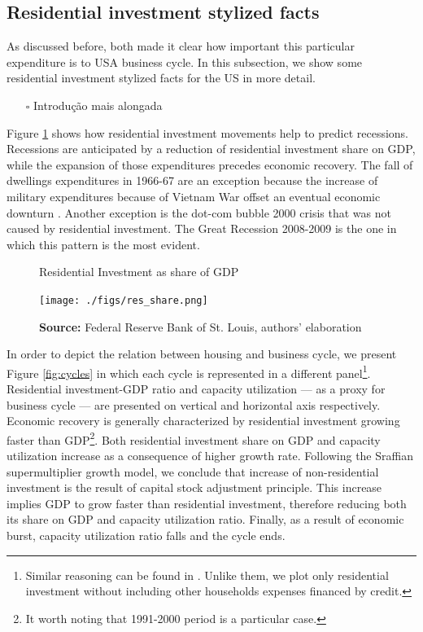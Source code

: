 \documentclass[11pt]{article}
\begin{document}
\subsection{Residential investment stylized facts}
\label{sec:orgb68aa85}

As discussed before, both \textcites{green_follow_1997}{leamer_housing_2007} made it clear how important this particular expenditure is to USA business cycle. In this subsection, we show some residential investment stylized facts for the US in more detail.

\begin{itemize}
\item[{$\square$}] Introdução mais alongada
\end{itemize}

Figure \ref{Investo_Resid_GDP} shows how residential investment movements help to predict recessions. Recessions are anticipated by a reduction of residential investment share on GDP, while the expansion of those expenditures precedes economic recovery. The fall of dwellings expenditures in 1966-67 are an exception because the increase of military expenditures because of Vietnam War offset an eventual economic downturn \cite[p.~20]{leamer_housing_2007}. Another exception is the dot-com bubble 2000 crisis that was not caused by residential investment. The Great Recession 2008-2009 is the one in which this pattern is the most evident. 



\begin{figure}[htb]
    \centering
        \caption{Residential Investment as share of GDP}
        \label{Investo_Resid_GDP}
    \texttt{[image: ./figs/res\_share.png]}
    \caption*{\textbf{Source:} Federal Reserve Bank of St. Louis, authors’ elaboration}
\end{figure}

In order to depict the relation between housing and business cycle, we present Figure \ref{fig:cycles} in which each cycle is represented in a different panel\footnote{Similar reasoning can be found in \textcite{fiebiger_trend_2017}. Unlike them, we plot only residential investment without including other households expenses financed by credit.}.
Residential investment-GDP ratio and capacity utilization --- as a proxy for business cycle --- are presented on vertical and horizontal axis respectively.
Economic recovery is generally characterized by residential investment growing faster than GDP\footnote{It worth noting that 1991-2000 period is a particular case.}. Both residential investment share on GDP and capacity utilization increase as a consequence of higher growth rate.
Following the Sraffian supermultiplier growth model, we conclude that increase of non-residential investment is the result of capital stock adjustment principle. This increase implies GDP to grow faster than residential investment, therefore reducing both its share on GDP and capacity utilization ratio. Finally, as a result of economic burst, capacity utilization ratio falls and the cycle ends.
\end{document}
